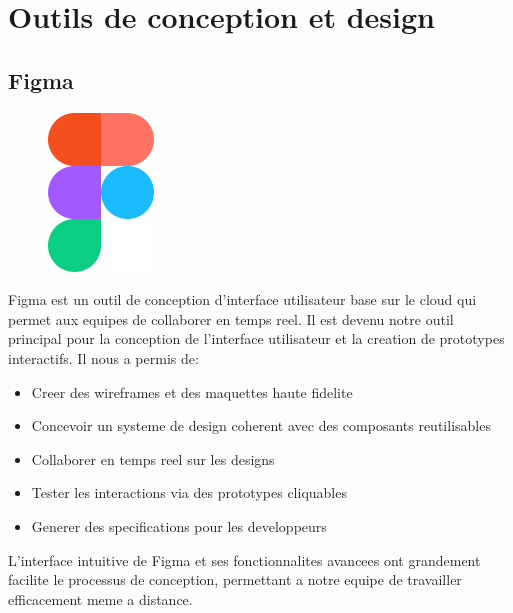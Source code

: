 \section{Outils de conception et design}

\subsection{Figma}
\begin{figure}
    \centering
    \includegraphics[width=0.25\textwidth]{assets/docs/figma.png}
\end{figure}
Figma est un outil de conception d'interface utilisateur base sur le cloud qui permet aux equipes de collaborer en temps reel. Il est devenu notre outil principal pour la conception de l'interface utilisateur et la creation de prototypes interactifs. Il nous a permis de:

\begin{itemize}
    \item Creer des wireframes et des maquettes haute fidelite
    \item Concevoir un systeme de design coherent avec des composants reutilisables
    \item Collaborer en temps reel sur les designs
    \item Tester les interactions via des prototypes cliquables
    \item Generer des specifications pour les developpeurs
\end{itemize}

L'interface intuitive de Figma et ses fonctionnalites avancees ont grandement facilite le processus de conception, permettant a notre equipe de travailler efficacement meme a distance.

